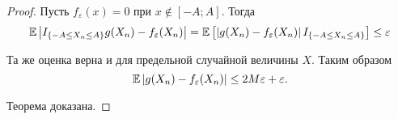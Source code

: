\begin{proof}
    Пусть $f_{\varepsilon}(x) = 0$ при $x \not\in [-A; A]$. Тогда
    \[ \mathbb{E} \left| I_{\{-A \le X_n \le A\}} g(X_n) - f_{\varepsilon}(X_n) \right| = \mathbb{E} \left[ \left| g(X_n) - f_{\varepsilon}(X_n) \right| I_{\{-A \le X_n \le A\}} \right] \le \varepsilon \]
    
    Та же оценка верна и для предельной случайной величины $X$. Таким образом
    \[ \mathbb{E} \left| g(X_n) - f_{\varepsilon}(X_n) \right| \le 2M\varepsilon + \varepsilon. \]
    
    Теорема доказана.
\end{proof}
